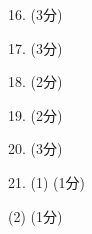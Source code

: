 \documentclass[11pt]{article}
\renewcommand{\u}{\uline{\hfill}} %
\begin{document}
\begin{minipage}{0.477\linewidth}
    \begin{tcolorbox}[left=0.5mm,right=0.5mm,height=21.5cm,colback=white,boxrule=0.5pt]
        \begin{framed}
            16. (3分) \u

            \u    
            
            \u

            \u

            17. (3分) \u

            \u    
            
            \u

            \u

            18. (2分) \u

            \u    
            
            \u

            \u
            
            19. (2分) \u

            \u    
            
            \u

            \u
            
            20. (3分) \u

            \u    
            
            \u

            \u
            
            21.  (1) (1分) \u

            \u
    
            \quad (2) (1分) \u
            
            \u

    
        \end{framed}
    
        \end{tcolorbox}
\end{minipage}\hfill
\end{document}

